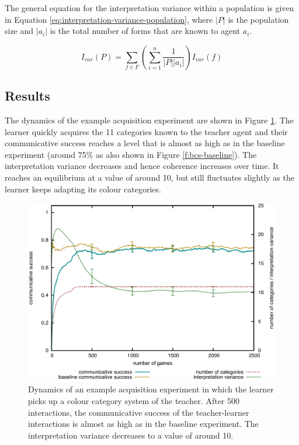 The general equation for the interpretation variance within a
population is given in Equation
\ref{eq:interpretation-variance-population}, where $|P|$ is the
population size and $|a_i|$ is the total number of forms that are
known to agent $a_i$.

\begin{equation}
I_{var} (P) = \sum_{f \in F} \left(\sum_{i=1}^{n} \frac{1}{|P||a_i|}\right) I_{var} (f)
\label{eq:interpretation-variance-population}
\end{equation}

\subsection{Results}

The dynamics of the example acquisition experiment are shown in Figure
\ref{f:basic-strategy-agent-categories}. The learner quickly acquires
the 11 categories known to the teacher agent and their communicative
success reaches a level that is almost as high as in the baseline
experiment (around 75\% as also shown in Figure
\ref{f:bcs-baseline}). The interpretation variance
decreases and hence coherence increases over time. It reaches an
equilibrium at a value of around 10, but still fluctuates slightly as
the learner keeps adapting its colour categories.

\begin{figure}[htbp]
  \begin{center}
    \includegraphics[width=.8\textwidth]{./basic-operators/figures/acquisition.pdf}
    \caption[Dynamics of an example acquisition experiment]{Dynamics
      of an example acquisition experiment in which the learner picks
      up a colour category system of the teacher. After 500
      interactions, the communicative success of the teacher-learner
      interactions is almost as high as in the baseline
      experiment. The interpretation variance decreases to a value of
      around 10.}
    \label{f:basic-strategy-agent-categories}
  \end{center}
\end{figure}

